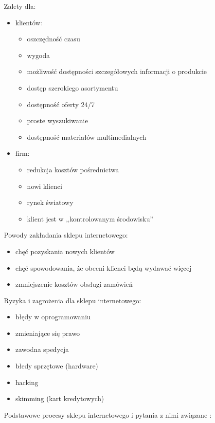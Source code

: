 \documentclass{article}
\begin{document}
Zalety dla:
\begin{itemize}
\item klientów:
\begin{itemize}
\item oszczędność czasu
\item wygoda
\item możliwość dostępności szczegółowych informacji o produkcie
\item dostęp szerokiego asortymentu
\item dostępność oferty 24/7
\item proste wyszukiwanie
\item dostępność materiałów multimedialnych
\end{itemize}
\item firm:
\begin{itemize}
\item redukcja kosztów pośrednictwa
\item nowi klienci
\item rynek światowy
\item klient jest w ,,kontrolowanym środowisku''
\end{itemize}
\end{itemize}
Powody zakładania sklepu internetowego:
\begin{itemize}
\item chęć pozyskania nowych klientów
\item chęć spowodowania, że obecni klienci będą wydawać więcej
\item zmniejszenie kosztów obsługi zamówień
\end{itemize}
Ryzyka i zagrożenia dla sklepu internetowego:
\begin{itemize}
\item błędy w oprogramowaniu
\item zmieniające się prawo
\item zawodna spedycja
\item błedy sprzętowe (hardware)
\item hacking
\item skimming (kart kredytowych)
\end{itemize}
Podstawowe procesy sklepu internetowego i pytania z nimi związane \cite{borowski:ec}:
\end{document}
